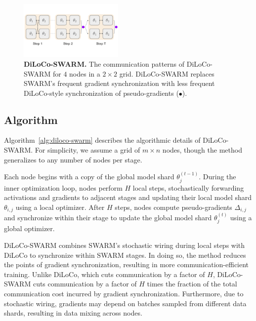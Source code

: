 \documentclass{article}
\newcommand{\purplecircle}{\textcolor{ppurple}{\LARGE$\bullet$}}
\begin{document}
\begin{figure}[ht]
    \centering
    \includegraphics[width=0.45\textwidth]{figures/diloco-swarm.pdf}
    \caption{\textbf{DiLoCo-SWARM.} The communication patterns of DiLoCo-SWARM for $4$ nodes in a $2\times 2$ grid. DiLoCo-SWARM replaces SWARM's frequent gradient synchronization with less frequent DiLoCo-style synchronization of pseudo-gradients (\purplecircle).}
    \label{fig:diloco-swarm}
\end{figure}

\subsection{Algorithm}

Algorithm~\ref{alg:diloco-swarm} describes the algorithmic details of DiLoCo-SWARM. For simplicity, we assume a grid of $m \times n$ nodes, though the method generalizes to any number of nodes per stage. 

Each node begins with a copy of the global model shard $\theta_j^{(t-1)}$. During the inner optimization loop, nodes perform $H$ local steps, stochastically forwarding activations and gradients to adjacent stages and updating their local model shard $\theta_{i,j}$ using a local optimizer. After $H$ steps, nodes compute pseudo-gradients $\Delta_{i,j}$ and synchronize within their stage to update the global model shard $\theta_j^{(t)}$ using a global optimizer.

DiLoCo-SWARM combines SWARM's stochastic wiring during local steps with DiLoCo to synchronize within SWARM stages. In doing so, the method reduces the points
of gradient synchronization, resulting in more communication-efficient training. Unlike DiLoCo, which cuts communication by a factor of $H$, DiLoCo-SWARM cuts communication by a factor of $H$ times the fraction of the total communication cost incurred by gradient synchronization. Furthermore, due to stochastic wiring, gradients may depend on batches sampled from different data shards, resulting in data mixing across nodes.
\end{document}
